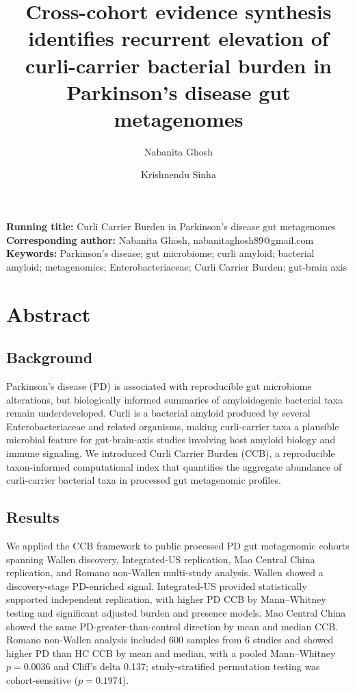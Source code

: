 \documentclass[12pt]{article}
\title{Cross-cohort evidence synthesis identifies recurrent elevation of curli-carrier bacterial burden in Parkinson's disease gut metagenomes}
\author[1]{Nabanita Ghosh}
\author[2]{Krishnendu Sinha}
\affil[1]{Department of Zoology, Maulanan Azad College, Kolkata, India}
\affil[2]{Department of Zoology, Jhargram Raj College, Jhargram, India}
\date{}
\begin{document}
\maketitle

\noindent\textbf{Running title:} Curli Carrier Burden in Parkinson's disease gut metagenomes\\
\textbf{Corresponding author:} Nabanita Ghosh, nabanitaghosh89@gmail.com\\
\textbf{Keywords:} Parkinson's disease; gut microbiome; curli amyloid; bacterial amyloid; metagenomics; Enterobacteriaceae; Curli Carrier Burden; gut-brain axis

\section*{Abstract}
\subsection*{Background}
Parkinson's disease (PD) is associated with reproducible gut microbiome alterations, but biologically informed summaries of amyloidogenic bacterial taxa remain underdeveloped. Curli is a bacterial amyloid produced by several Enterobacteriaceae and related organisms, making curli-carrier taxa a plausible microbial feature for gut-brain-axis studies involving host amyloid biology and immune signaling. We introduced Curli Carrier Burden (CCB), a reproducible taxon-informed computational index that quantifies the aggregate abundance of curli-carrier bacterial taxa in processed gut metagenomic profiles.

\subsection*{Results}
We applied the CCB framework to public processed PD gut metagenomic cohorts spanning Wallen discovery, Integrated-US replication, Mao Central China replication, and Romano non-Wallen multi-study analysis. Wallen showed a discovery-stage PD-enriched signal. Integrated-US provided statistically supported independent replication, with higher PD CCB by Mann--Whitney testing and significant adjusted burden and presence models. Mao Central China showed the same PD-greater-than-control direction by mean and median CCB. Romano non-Wallen analysis included 600 samples from 6 studies and showed higher PD than HC CCB by mean and median, with a pooled Mann--Whitney $p=0.0036$ and Cliff's delta 0.137; study-stratified permutation testing was cohort-sensitive ($p=0.1974$).
\end{document}
